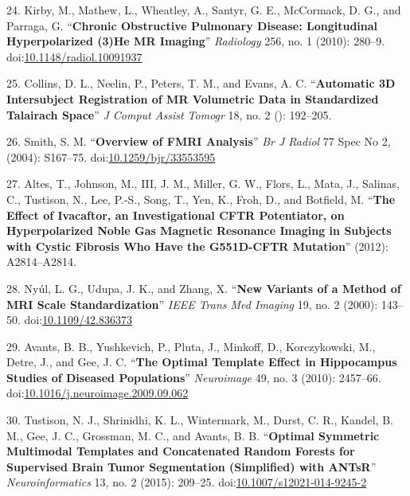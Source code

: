 \documentclass[11pt,]{article}
\begin{document}
\hypertarget{ref-Kirby:2010aa}{}
24. Kirby, M., Mathew, L., Wheatley, A., Santyr, G. E., McCormack, D.
G., and Parraga, G. ``\textbf{Chronic Obstructive Pulmonary Disease:
Longitudinal Hyperpolarized (3)He MR Imaging}'' \emph{Radiology} 256,
no. 1 (2010): 280--9.
doi:\href{https://doi.org/10.1148/radiol.10091937}{10.1148/radiol.10091937}

\hypertarget{ref-Collins:1994aa}{}
25. Collins, D. L., Neelin, P., Peters, T. M., and Evans, A. C.
``\textbf{Automatic 3D Intersubject Registration of MR Volumetric Data
in Standardized Talairach Space}'' \emph{J Comput Assist Tomogr} 18, no.
2 (): 192--205.

\hypertarget{ref-Smith:2004aa}{}
26. Smith, S. M. ``\textbf{Overview of FMRI Analysis}'' \emph{Br J
Radiol} 77 Spec No 2, (2004): S167--75.
doi:\href{https://doi.org/10.1259/bjr/33553595}{10.1259/bjr/33553595}

\hypertarget{ref-Altes:2012aa}{}
27. Altes, T., Johnson, M., III, J. M., Miller, G. W., Flors, L., Mata,
J., Salinas, C., Tustison, N., Lee, P.-S., Song, T., Yen, K., Froh, D.,
and Botfield, M. ``\textbf{The Effect of Ivacaftor, an Investigational
CFTR Potentiator, on Hyperpolarized Noble Gas Magnetic Resonance Imaging
in Subjects with Cystic Fibrosis Who Have the G551D-CFTR Mutation}''
(2012): A2814--A2814.

\hypertarget{ref-Nyul:2000aa}{}
28. Nyúl, L. G., Udupa, J. K., and Zhang, X. ``\textbf{New Variants of a
Method of MRI Scale Standardization}'' \emph{IEEE Trans Med Imaging} 19,
no. 2 (2000): 143--50.
doi:\href{https://doi.org/10.1109/42.836373}{10.1109/42.836373}

\hypertarget{ref-Avants:2010aa}{}
29. Avants, B. B., Yushkevich, P., Pluta, J., Minkoff, D., Korczykowski,
M., Detre, J., and Gee, J. C. ``\textbf{The Optimal Template Effect in
Hippocampus Studies of Diseased Populations}'' \emph{Neuroimage} 49, no.
3 (2010): 2457--66.
doi:\href{https://doi.org/10.1016/j.neuroimage.2009.09.062}{10.1016/j.neuroimage.2009.09.062}

\hypertarget{ref-Tustison:2015aa}{}
30. Tustison, N. J., Shrinidhi, K. L., Wintermark, M., Durst, C. R.,
Kandel, B. M., Gee, J. C., Grossman, M. C., and Avants, B. B.
``\textbf{Optimal Symmetric Multimodal Templates and Concatenated Random
Forests for Supervised Brain Tumor Segmentation (Simplified) with
ANTsR}'' \emph{Neuroinformatics} 13, no. 2 (2015): 209--25.
doi:\href{https://doi.org/10.1007/s12021-014-9245-2}{10.1007/s12021-014-9245-2}
\end{document}
